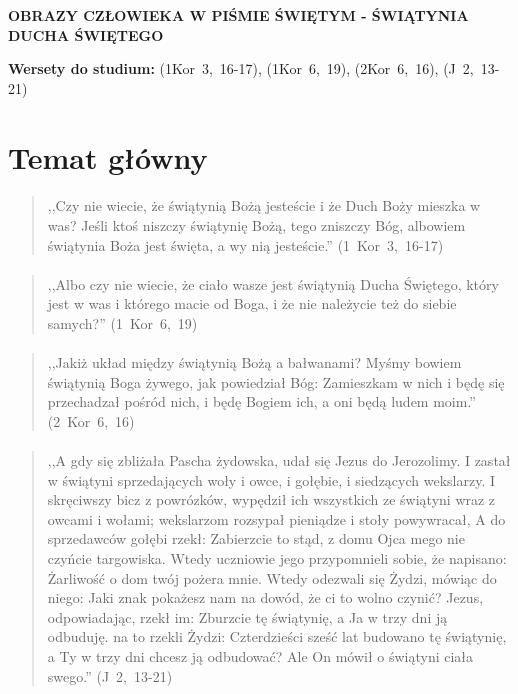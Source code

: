\documentclass[10pt,a4paper,oneside]{article}
\begin{document}
\centerline{\textbf{\MakeUppercase{Obrazy człowieka w Piśmie Świętym - Świątynia Ducha Świętego}}}
\begin{center}
\textbf{Wersety do studium:} \mbox{(1Kor 3, 16-17)}, \mbox{(1Kor 6, 19)}, \mbox{(2Kor 6, 16)}, \mbox{(J 2, 13-21)}
\end{center}
\section{Temat główny}
\paragraph{}
\begin{quote}
,,Czy nie wiecie, że świątynią Bożą jesteście i że Duch Boży mieszka w was? Jeśli ktoś niszczy świątynię Bożą, tego zniszczy Bóg, albowiem świątynia Boża jest święta, a wy nią jesteście.'' \mbox{(1 Kor 3, 16-17)}
\end{quote}
\paragraph{}
\begin{quote}
,,Albo czy nie wiecie, że ciało wasze jest świątynią Ducha Świętego, który jest w was i którego macie od Boga, i że nie należycie też do siebie samych?'' \mbox{(1 Kor 6, 19)}
\end{quote}
\paragraph{}
\begin{quote}
,,Jakiż układ między świątynią Bożą a bałwanami? Myśmy bowiem świątynią Boga żywego, jak powiedział Bóg: Zamieszkam w nich i będę się przechadzał pośród nich, i będę Bogiem ich, a oni będą ludem moim.'' \mbox{(2 Kor 6, 16)}
\end{quote}
\paragraph{}
\begin{quote}
,,A gdy się zbliżała Pascha żydowska, udał się Jezus do Jerozolimy. I zastał w świątyni sprzedających woły i owce, i gołębie, i siedzących wekslarzy. I skręciwszy bicz z powrózków, wypędził ich wszystkich ze świątyni wraz z owcami i wołami; wekslarzom rozsypał pieniądze i stoły powywracał, A do sprzedawców gołębi rzekł: Zabierzcie to stąd, z domu Ojca mego nie czyńcie targowiska. Wtedy uczniowie jego przypomnieli sobie, że napisano: Żarliwość o dom twój pożera mnie. Wtedy odezwali się Żydzi, mówiąc do niego: Jaki znak pokażesz nam na dowód, że ci to wolno czynić? Jezus, odpowiadając, rzekł im: Zburzcie tę świątynię, a Ja w trzy dni ją odbuduję. na to rzekli Żydzi: Czterdzieści sześć lat budowano tę świątynię, a Ty w trzy dni chcesz ją odbudować? Ale On mówił o świątyni ciała swego.'' \mbox{(J 2, 13-21)}
\end{quote}
\end{document}
